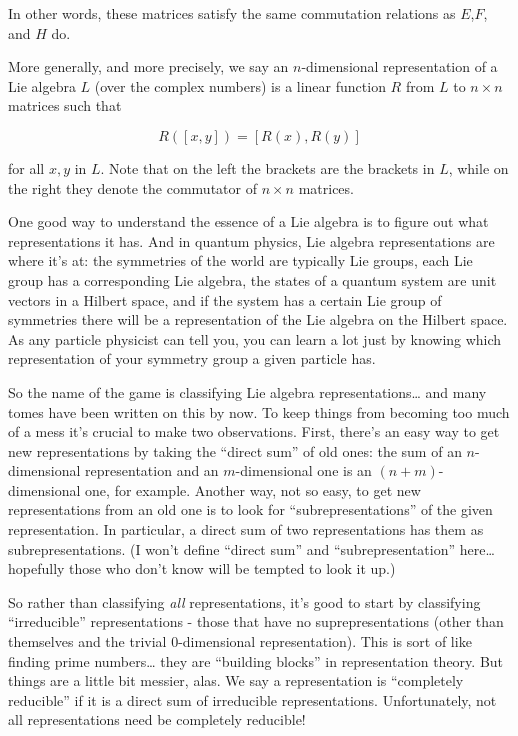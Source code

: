 \documentclass{article}
\begin{document}
In other words, these matrices satisfy the same commutation relations as
\(E\),\(F\), and \(H\) do.

More generally, and more precisely, we say an \(n\)-dimensional
representation of a Lie algebra \(L\) (over the complex numbers) is a
linear function \(R\) from \(L\) to \(n\times n\) matrices such that

\[R([x,y]) = [R(x),R(y)]\]

for all \(x,y\) in \(L\). Note that on the left the brackets are the
brackets in \(L\), while on the right they denote the commutator of
\(n\times n\) matrices.

One good way to understand the essence of a Lie algebra is to figure out
what representations it has. And in quantum physics, Lie algebra
representations are where it's at: the symmetries of the world are
typically Lie groups, each Lie group has a corresponding Lie algebra,
the states of a quantum system are unit vectors in a Hilbert space, and
if the system has a certain Lie group of symmetries there will be a
representation of the Lie algebra on the Hilbert space. As any particle
physicist can tell you, you can learn a lot just by knowing which
representation of your symmetry group a given particle has.

So the name of the game is classifying Lie algebra
representations\ldots{} and many tomes have been written on this by now.
To keep things from becoming too much of a mess it's crucial to make two
observations. First, there's an easy way to get new representations by
taking the ``direct sum'' of old ones: the sum of an \(n\)-dimensional
representation and an \(m\)-dimensional one is an \((n+m)\)-dimensional
one, for example. Another way, not so easy, to get new representations
from an old one is to look for ``subrepresentations'' of the given
representation. In particular, a direct sum of two representations has
them as subrepresentations. (I won't define ``direct sum'' and
``subrepresentation'' here\ldots{} hopefully those who don't know will
be tempted to look it up.)

So rather than classifying \emph{all} representations, it's good to
start by classifying ``irreducible'' representations - those that have
no suprepresentations (other than themselves and the trivial
0-dimensional representation). This is sort of like finding prime
numbers\ldots{} they are ``building blocks'' in representation theory.
But things are a little bit messier, alas. We say a representation is
``completely reducible'' if it is a direct sum of irreducible
representations. Unfortunately, not all representations need be
completely reducible!
\end{document}
